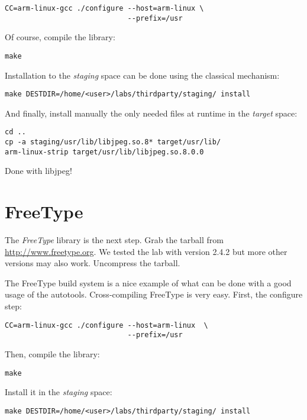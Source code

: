 \begin{verbatim}
CC=arm-linux-gcc ./configure --host=arm-linux \
                             --prefix=/usr
\end{verbatim}

Of course, compile the library:

\begin{verbatim}
make
\end{verbatim}

Installation to the {\em staging} space can be done using the
classical  mechanism:

\begin{verbatim}
make DESTDIR=/home/<user>/labs/thirdparty/staging/ install
\end{verbatim}

And finally, install manually the only needed files at runtime in the
{\em target} space:

\begin{verbatim}
cd ..
cp -a staging/usr/lib/libjpeg.so.8* target/usr/lib/
arm-linux-strip target/usr/lib/libjpeg.so.8.0.0
\end{verbatim}

Done with libjpeg!

\section{FreeType}

The {\em FreeType} library is the next step. Grab the tarball from
\url{http://www.freetype.org}. We tested the lab with version 2.4.2
but more other versions may also work. Uncompress the tarball.

The FreeType build system is a nice example of what can be done with a
good usage of the autotools. Cross-compiling FreeType is very
easy. First, the configure step:

\begin{verbatim}
CC=arm-linux-gcc ./configure --host=arm-linux  \
                             --prefix=/usr
\end{verbatim}

Then, compile the library:

\begin{verbatim}
make
\end{verbatim}

Install it in the {\em staging} space:

\begin{verbatim}
make DESTDIR=/home/<user>/labs/thirdparty/staging/ install
\end{verbatim}


